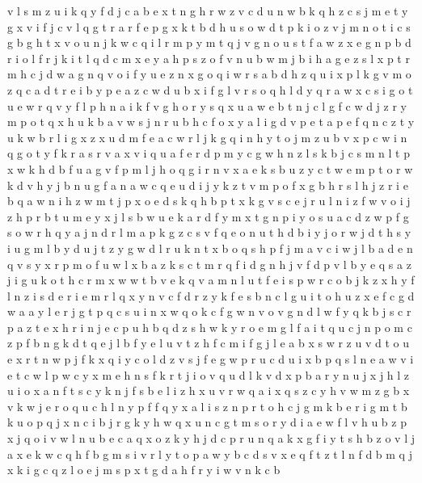 \documentclass{article}
\begin{document}
v l s m z u i k q y f d j c a b e x t n g h r w
z v c d u n
w b k q h z c s j m e t y g x v i f
j c
v l q g t r
a r f e p g x k t b d h u s o w
d t p k i o z v j m
n o
t i c s g
b g h t x v o u n j k w c q i l r m p
y m t q j v g n o u s
t f
a w z x e g n p b d r i o l f
r j k i t l q d c m x e y a h p s z o f v n u b
w m j b i h a g e z
s l x p t r m h c j d w a g n q v o i f y u e z
n x g o q i w r s a b d h z
q u i
x p l k g v m o z q c a d t r e i b
y p e a z c w d u b x i f g l v r s o q h
l d
y q r a w
x c s i g o t u e w r q v y f l p h n a
i k f v g h o r y s q x u a w e b t n j c l
g f c w d j z r y m p o t q x h u k b a v
w s j n r u b h c f o x y a l i g d v p e t
a p e f q n c z t y u k w b r l i g x
z x u d m f e a c w r l j k g q i n h y t o
j m z u b v x p c w i n q g o t y f k r a s
r v a
x v i q u a f e r d p m y c g w h n z l s k b
j c s m n l t p x w k h d b f u a g v
f p m l j h o q g i r n v x a e k s b u z y c t w
e m p t o r w k d v h y j b n u g f a
n a w c q e u d i j y k z t v m p o f x g b h r s l
h j z r i e b q a w
n i h z w m t
j p x o e d s k
q h b p t x k g v s c e j r u l n i z f
w v o i j z h p r b t u m e y x
j l s b w u e k a r d f y m x t g n p
i y o s u a c d z w p
f g s o w r h q y a j n d
r l m a p k g z c s v f q e o n u t h d b i y j
o r w j d t h s y i u g m l b
y d u j t
z y g w d l r u k n t x b o q s h p f j m a v
c i w j l b a d e n q v s y x r p m o f
u w l x b a z k s c t m r q f i d g n h j v
f d p v l b y e q s a z j i g u k o t h c r m x w
w t b v e k
q v a m n l u t f e i s p w r c o b j k z x h y
f l n z i s d e r
i e m r l q x y n v c f
d r z y k f e s b n c l g u
i t o h u z x e f c g d w a
a y l e r j g t p q c s u i n x
w
q o k c f g w n v
o v g n d l w f y q k b j s c r p a z t e x h
r i n j e c p u h b q d
z s h w k y r o e m g l f a i t q u c j n p
o m c z p f b n g k d t q e j l
b f y
e l u v t z h f
c m i f g j l e a b x s w r z u v d t o
u e x r t n w p j f k
x q i y c o l d z v s j f e g w p r u
c d u i x b p q s l n e a w v
i e t c w l
p w c y x m e h n s f k r t j i o v q u d l
k v d x p b a r y n u j
x
j h l z u i o x a n f t s c
y k n j f s b e l i z h x u v r w q
a i x q s z c y h v w
m z g b x v k w j e r o q u c h l n y p f
f q y x a l i s z n p r t o h c j g m k b
e r i g m t b k u o p q j x n c
i b j r g k y h w q x u
n c g t m s o r y d i a e w f l v h u b z p x j q
o i
v w l n u b e c a q x o z k y h j
d c p r u n q a k x g f i y t s h b z o v l
j a x e k w c q h f b g m s i v r l y t o p
a w y b c d s v x e q f t
z t l n f d b m q j x k i g c
q z l o e j m s p x t g d a h f r y i w v n k c b
\end{document}
